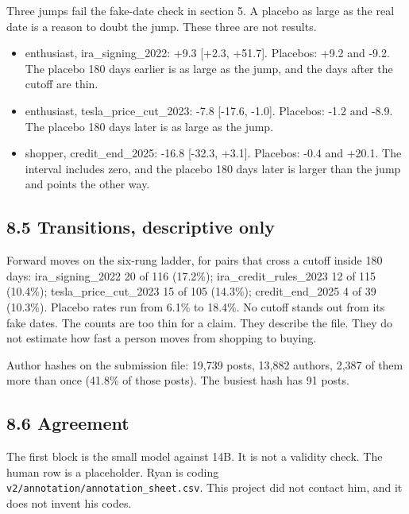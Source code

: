 \documentclass[11pt]{article}
\begin{document}
Three jumps fail the fake-date check in section 5. A placebo as large as the real date is a reason to doubt the jump. These three are not results.


\begin{itemize}
\item enthusiast, ira\_signing\_2022: +9.3 [+2.3, +51.7]. Placebos: +9.2 and -9.2. The placebo 180 days earlier is as large as the jump, and the days after the cutoff are thin.
\item enthusiast, tesla\_price\_cut\_2023: -7.8 [-17.6, -1.0]. Placebos: -1.2 and -8.9. The placebo 180 days later is as large as the jump.
\item shopper, credit\_end\_2025: -16.8 [-32.3, +3.1]. Placebos: -0.4 and +20.1. The interval includes zero, and the placebo 180 days later is larger than the jump and points the other way.
\end{itemize}


\subsection{8.5 Transitions, descriptive only}

Forward moves on the six-rung ladder, for pairs that cross a cutoff inside 180 days: ira\_signing\_2022 20 of 116 (17.2\%); ira\_credit\_rules\_2023 12 of 115 (10.4\%); tesla\_price\_cut\_2023 15 of 105 (14.3\%); credit\_end\_2025 4 of 39 (10.3\%). Placebo rates run from 6.1\% to 18.4\%. No cutoff stands out from its fake dates. The counts are too thin for a claim. They describe the file. They do not estimate how fast a person moves from shopping to buying.


Author hashes on the submission file: 19,739 posts, 13,882 authors, 2,387 of them more than once (41.8\% of those posts). The busiest hash has 91 posts.


\subsection{8.6 Agreement}

The first block is the small model against 14B. It is not a validity check. The human row is a placeholder. Ryan is coding \texttt{v2/annotation/annotation\_sheet.csv}. This project did not contact him, and it does not invent his codes.
\end{document}
